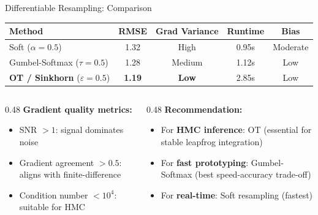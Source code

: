 \documentclass[aspectratio=169,10pt]{beamer}
\newcommand{\highlight}[1]{\textcolor{jpmlightblue}{\textbf{#1}}}
\begin{document}
\begin{frame}{Differentiable Resampling: Comparison}
\begin{table}
\centering
\begin{tabular}{@{}lcccc@{}}
  \toprule
  \textbf{Method} & \textbf{RMSE} & \textbf{Grad Variance} & \textbf{Runtime} & \textbf{Bias} \\
  \midrule
  Soft ($\alpha=0.5$) & 1.32 & High & 0.95s & Moderate \\
  Gumbel-Softmax ($\tau=0.5$) & 1.28 & Medium & 1.12s & Low \\
  \textbf{OT / Sinkhorn} ($\varepsilon=0.5$) & \textbf{1.19} & \textbf{Low} & 2.85s & Low \\
  \bottomrule
\end{tabular}
\end{table}

\vspace{0.5em}
\begin{columns}[T]
\begin{column}{0.48\textwidth}
\textbf{Gradient quality metrics:}
\begin{itemize}
  \item SNR $> 1$: signal dominates noise
  \item Gradient agreement $> 0.5$: aligns with finite-difference
  \item Condition number $< 10^4$: suitable for HMC
\end{itemize}
\end{column}
\begin{column}{0.48\textwidth}
\textbf{Recommendation:}
\begin{itemize}
  \item For \highlight{HMC inference}: OT (essential for stable leapfrog integration)
  \item For \highlight{fast prototyping}: Gumbel-Softmax (best speed-accuracy trade-off)
  \item For \highlight{real-time}: Soft resampling (fastest)
\end{itemize}
\end{column}
\end{columns}
\end{frame}
\end{document}

